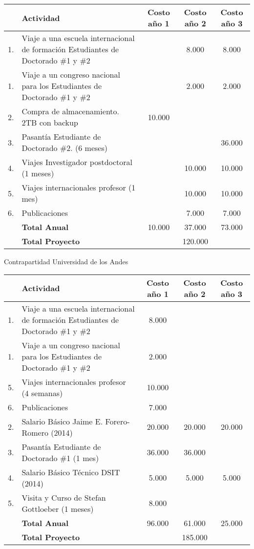 \documentclass{article}
\begin{document}
\begin{tabular}{|l |p{4.5cm}| c |c |c|}\hline
 & Actividad & Costo a\~no 1 & Costo a\~no 2 & Costo a\~no 3\\\hline
1. & Viaje a una escuela internacional de formaci\'on Estudiantes de
Doctorado \#1 y \#2 & & 8.000 & 8.000\\\hline
1. & Viaje a un congreso nacional para los Estudiantes de
Doctorado \#1 y \#2 & & 2.000 & 2.000 \\\hline
2. & Compra de almacenamiento. 2TB con backup & 10.000 & & \\\hline
3. & Pasant\'ia Estudiante de Doctorado \#2. (6 meses)& &  & 36.000\\\hline
4. & Viajes Investigador postdoctoral (1 meses)& & 10.000 & 10.000\\\hline
5. & Viajes internacionales profesor (1 mes) & & 10.000 & 10.000 \\ \hline
6. & Publicaciones &  & 7.000 & 7.000\\\hline 
& {\bf Total Anual} & 10.000 & 37.000 & 73.000\\\hline
& {{\bf Total Proyecto}} & \multicolumn{3}{|c|}{120.000}\\\hline
\end{tabular}


Contrapartidad Universidad de los Andes


\begin{tabular}{|l |p{4.5cm}| c |c |c|}\hline
& Actividad & Costo a\~no 1 & Costo a\~no 2 & Costo a\~no 3\\\hline
1. & Viaje a una escuela internacional de formaci\'on Estudiantes de
Doctorado \#1 y \#2 & 8.000 & & \\\hline
1. & Viaje a un congreso nacional para los Estudiantes de
Doctorado \#1 y \#2 & 2.000 & & \\\hline
5. & Viajes internacionales profesor (4 semanas) & 10.000 & & \\ \hline
6. & Publicaciones &  7.000 & & \\\hline 
2. & Salario B\'asico Jaime E. Forero-Romero (2014) & 20.000 & 20.000
& 20.000 \\\hline  

3. & Pasant\'ia Estudiante de Doctorado \#1 (1 mes) & 36.000 &
36.000 & \\\hline

4. & Salario B\'asico T\'ecnico DSIT (2014) & 5.000 & 5.000
& 5.000 \\\hline  

5. & Visita y Curso de Stefan Gottloeber (1 meses) & 8.000 & & \\\hline

& {\bf Total Anual} & 96.000 & 61.000 & 25.000\\\hline
& {{\bf Total Proyecto}} & \multicolumn{3}{|c|}{185.000}\\\hline

\end{tabular} 
\end{document}
